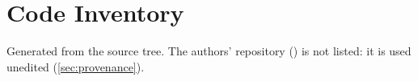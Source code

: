 \chapter{Code Inventory}\label{app:code}

Generated from the source tree. The authors' repository () is not listed: it is
used unedited (\cref{sec:provenance}).


